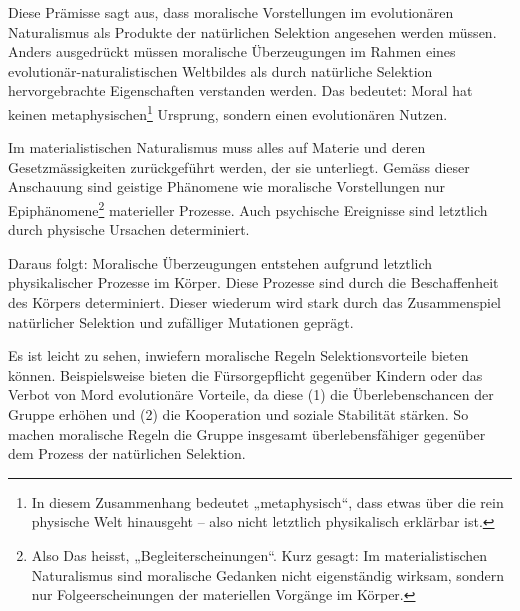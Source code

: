 \documentclass[11pt,a4paper]{article}
\begin{document}
	Diese Prämisse sagt aus, dass moralische Vorstellungen im evolutionären Naturalismus als Produkte der natürlichen Selektion angesehen werden müssen. Anders ausgedrückt müssen moralische Überzeugungen im Rahmen eines evolutionär-naturalistischen Weltbildes als durch natürliche Selektion hervorgebrachte Eigenschaften verstanden werden. Das bedeutet: Moral hat keinen metaphysischen\footnote{In diesem Zusammenhang bedeutet „metaphysisch“, dass etwas über die rein physische Welt hinausgeht – also nicht letztlich physikalisch erklärbar ist.} Ursprung, sondern einen evolutionären Nutzen.
	
	Im materialistischen Naturalismus muss alles auf Materie und deren Gesetzmässigkeiten zurückgeführt werden, der sie unterliegt. Gemäss dieser Anschauung sind geistige Phänomene wie moralische Vorstellungen nur Epiphänomene\footnote{  Also Das heisst, „Begleiterscheinungen“. Kurz gesagt: Im materialistischen Naturalismus sind moralische Gedanken nicht eigenständig wirksam, sondern nur Folgeerscheinungen der materiellen Vorgänge im Körper.} materieller Prozesse. Auch psychische Ereignisse sind letztlich durch physische Ursachen determiniert.
	
	Daraus folgt: Moralische Überzeugungen entstehen aufgrund letztlich physikalischer Prozesse im Körper. Diese Prozesse sind durch die Beschaffenheit des Körpers determiniert. Dieser wiederum wird stark durch das Zusammenspiel natürlicher Selektion und zufälliger Mutationen geprägt.
	
	Es ist leicht zu sehen, inwiefern moralische Regeln Selektionsvorteile bieten können. Beispielsweise bieten die Fürsorgepflicht gegenüber Kindern oder das Verbot von Mord evolutionäre Vorteile, da diese (1) die Überlebenschancen der Gruppe erhöhen und (2) die Kooperation und soziale Stabilität stärken. So machen moralische Regeln die Gruppe insgesamt überlebensfähiger gegenüber dem Prozess der natürlichen Selektion.
	
%	
%	
	
\end{document}

